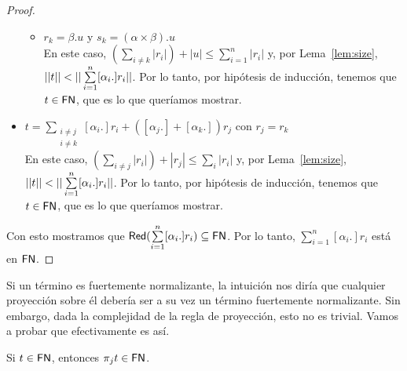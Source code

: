 \begin{proof}
\begin{itemize}
\begin{itemize}
        \item \( r_k = \beta . u \) y \( s_k = (\alpha \times \beta) . u \)
        \\ En este caso, \( (\sum\limits_{i \neq k} |r_i|) + |u| \leq \sum\limits_{i = 1}^n |r_i| \)
        y, por Lema~\ref{lem:size}, \( ||t|| < ||\sum\limits_{i = 1}^{n} [\alpha_i .] r_i|| \).
        Por lo tanto, por hipótesis de inducción, tenemos que \( t \in \mathsf{FN} \), que es lo que queríamos mostrar.
      \end{itemize}
    \item \( t = \sum\limits_{\substack{i\neq j\\ i\neq k}} [\alpha_i .] r_i + ([\alpha_j .] + [\alpha_k .]) r_j \) con \( r_j = r_k \)
      \\ En este caso, \( (\sum\limits_{i \neq j} |r_i|) + |r_j| \leq \sum\limits_i |r_i| \)
      y, por Lema~\ref{lem:size}, \( ||t|| < ||\sum\limits_{i = 1}^{n} [\alpha_i .] r_i|| \).
      Por lo tanto, por hipótesis de inducción, tenemos que \( t \in \mathsf{FN} \), que es lo que queríamos mostrar.
  \end{itemize}
  Con esto mostramos que \( \mathsf{Red} (\sum\limits_{i = 1}^{n} [\alpha_i .] r_i) \subseteq \mathsf{FN} \). Por lo tanto, \( \sum\limits_{i = 1}^{n} [\alpha_i .] r_i \) está en \( \mathsf{FN} \).
\end{proof}

Si un término es fuertemente normalizante, la intuición nos diría que cualquier proyección sobre él debería ser a su vez un término fuertemente normalizante. Sin embargo, dada la complejidad de la regla de proyección, esto no es trivial. Vamos a probar que efectivamente es así.

\begin{lemma}\label{lem:t_implies_proj_t}
  Si \( t \in \mathsf{FN} \), entonces \( \pi_{j} t \in \mathsf{FN} \).
\end{lemma}

